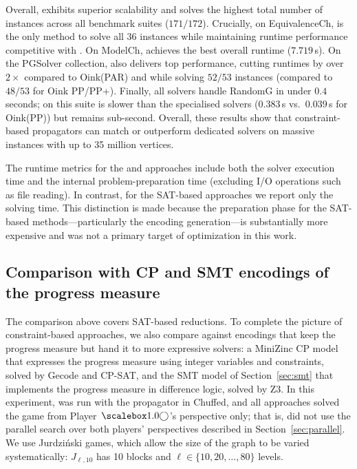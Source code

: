 \documentclass[a4paper,fleqn]{cas-sc}
\begin{document}
Overall, \noc exhibits superior scalability and solves the highest total number of instances across all benchmark suites ($171/172$). Crucially, on \textsf{EquivalenceCh}, \noc is the only method to solve all 36 instances while maintaining runtime performance competitive with \zra. On \textsf{ModelCh}, \noc achieves the best overall runtime ($7.719$\,s). On the \textsf{PGSolver} collection, \noc also delivers top performance, cutting runtimes by over $2\times$ compared to Oink(PAR) and \zra while solving $52/53$ instances (compared to $48/53$ for Oink PP/PP+). Finally, all solvers handle \textsf{RandomG} in under $0.4$ seconds; on this suite \noc is slower than the specialised solvers ($0.383$\,s vs.\ $0.039$\,s for Oink(PP)) but remains sub-second. Overall, these results show that constraint-based propagators can match or outperform dedicated solvers on massive instances with up to 35 million vertices.

The runtime metrics for the \noc and \zra approaches include both the solver execution time and the internal problem-preparation time (excluding I/O operations such as file reading). In contrast, for the SAT-based approaches we report only the solving time. This distinction is made because the preparation phase for the SAT-based methods—particularly the encoding generation—is substantially more expensive and was not a primary target of optimization in this work. 

\subsection{Comparison with CP and SMT encodings of the progress measure}\label{sec:cp-smt}

The comparison above covers SAT-based reductions. To complete the picture of constraint-based approaches, we also compare \noc against encodings that keep the progress measure but hand it to more expressive solvers: a MiniZinc CP model that expresses the progress measure using integer variables and constraints, solved by Gecode and CP-SAT, and the SMT model of Section~\ref{sec:smt} that implements the progress measure in difference logic, solved by Z3. In this experiment, \noc was run with the \nocmemo propagator in Chuffed, and all approaches solved the game from Player~$\even$'s perspective only; that is, \noc did not use the parallel search over both players' perspectives described in Section~\ref{sec:parallel}. We use Jurdziński games, which allow the size of the graph to be varied systematically: $J_{\ell,10}$ has 10 blocks and $\ell \in \{10, 20, \dots, 80\}$ levels.
\end{document}
